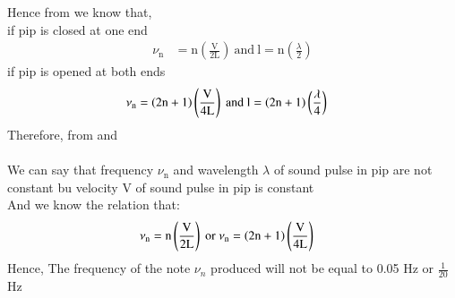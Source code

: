 \documentclass[beamer]{IEEEtran}
\theoremstyle{remark}
\begin{document}
Hence from \brak{\ref{a1}} we know that,\\
if pip is closed at one end\\
\begin{align}
\label{a2}
\nu_\text{n}&=\text{n}\left(\frac{\text{V}}{\text{2L}}\right)\ \text{and}\ \text{l}=\text{n}\left(\frac{\lambda}{2}\right)
\end{align}
if pip is opened at both ends\\
\begin{align}
\label{a3}
\nu_\text{n}&=\brak{2\text{n}+1}\left(\frac{\text{V}}{4\text{L}}\right)\ \text{and}\ \text{l}=\brak{2\text{n}+1}\left(\frac{\lambda}{4}\right)
\end{align}
Therefore, from \brak{\ref{a2}} and \brak{\ref{a3}}\\\\
We can say that frequency $\nu_\text{n}$ and wavelength $\lambda$ of sound pulse in pip are not constant bu velocity V of sound pulse in pip is constant\\

 And we know the relation that:
\begin{align}
    \label{a4}
    \nu_\text{n}&=\text{n}\left(\frac{\text{V}}{2\text{L}}\right)\ \text{or}\ \nu_\text{n}=\brak{2\text{n}+1}\left(\frac{\text{V}}{4\text{L}}\right)
\end{align}
Hence, The frequency of the note $\nu_n$ produced will not be equal to 0.05 Hz or $\frac{1}{20}$ Hz 
\end{document}
